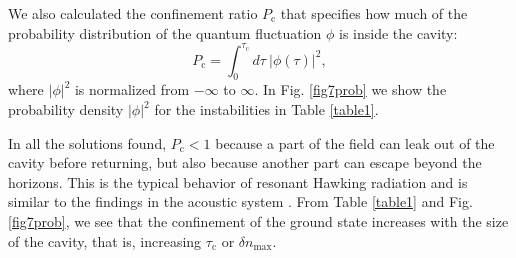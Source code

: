 \documentclass[aps,pra,reprint,amsmath,amssymb,showpacs,groupedaddress,floatfix]{revtex4-1}
\begin{document}
We also calculated the confinement ratio $P_\text{c}$ that specifies how much of the probability distribution of the quantum fluctuation $\phi$ is inside the cavity:
\begin{equation}
P_{\text{c}}=\int_0^{\tau_\text{c}} d\tau \ |\phi(\tau)|^2,
\end{equation}
where $|\phi|^2$ is normalized from $-\infty$ to $\infty$. In Fig. \ref{fig7prob} we show the probability density $|\phi|^2$ for the instabilities in Table \ref{table1}. %

In all the solutions found, $P_\text{c}< 1$ because a part of the field can leak out of the cavity before returning, but also because another part can escape beyond the horizons. This is the typical behavior of resonant Hawking radiation and is similar to the findings in the acoustic system \cite{2018Bermudez,curtis2019evanescent,Coutant2019}. From Table \ref{table1} and Fig. \ref{fig7prob}, we see that the confinement of the ground state increases with the size of the cavity, that is, increasing $\tau_\text{c}$ or $\delta n_\text{max}$.
\end{document}
